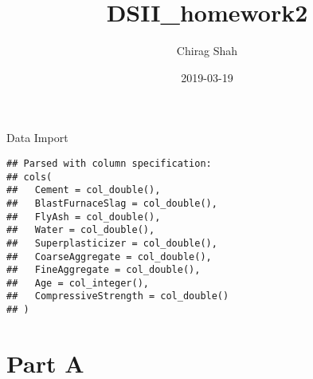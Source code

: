 \documentclass[]{article}
\title{DSII\_homework2}
\author{Chirag Shah}
\date{2019-03-19}
\newenvironment{Shaded}{\begin{snugshade}}{\end{snugshade}}
\newcommand{\KeywordTok}[1]{\textcolor[rgb]{0.13,0.29,0.53}{\textbf{#1}}}
\newcommand{\StringTok}[1]{\textcolor[rgb]{0.31,0.60,0.02}{#1}}
\newcommand{\OperatorTok}[1]{\textcolor[rgb]{0.81,0.36,0.00}{\textbf{#1}}}
\newcommand{\NormalTok}[1]{#1}
\begin{document}
\maketitle

Data Import

\begin{Shaded}
\end{Shaded}

\begin{verbatim}
## Parsed with column specification:
## cols(
##   Cement = col_double(),
##   BlastFurnaceSlag = col_double(),
##   FlyAsh = col_double(),
##   Water = col_double(),
##   Superplasticizer = col_double(),
##   CoarseAggregate = col_double(),
##   FineAggregate = col_double(),
##   Age = col_integer(),
##   CompressiveStrength = col_double()
## )
\end{verbatim}

\section{Part A}\label{part-a}
\end{document}
